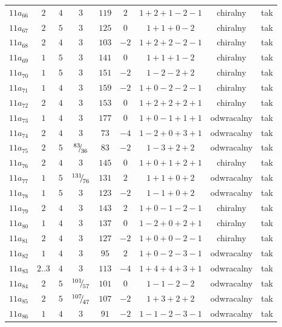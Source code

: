 \begin{longtable}{ccccccccc}
$11a_{66}$ & $2$ & $4$ & $3$ & $119$ & $2$ & $1+2+1-2-1$ & chiralny & tak \\
$11a_{67}$ & $2$ & $5$ & $3$ & $125$ & $0$ & $1+1+0-2$ & chiralny & tak \\
$11a_{68}$ & $2$ & $4$ & $3$ & $103$ & $-2$ & $1+2+2-2-1$ & chiralny & tak \\
$11a_{69}$ & $1$ & $5$ & $3$ & $141$ & $0$ & $1+1+1-2$ & chiralny & tak \\
$11a_{70}$ & $1$ & $5$ & $3$ & $151$ & $-2$ & $1-2-2+2$ & chiralny & tak \\
$11a_{71}$ & $1$ & $4$ & $3$ & $159$ & $-2$ & $1+0-2-2-1$ & chiralny & tak \\
$11a_{72}$ & $2$ & $4$ & $3$ & $153$ & $0$ & $1+2+2+2+1$ & chiralny & tak \\
$11a_{73}$ & $1$ & $4$ & $3$ & $177$ & $0$ & $1+0-1+1+1$ & odwracalny & tak \\
$11a_{74}$ & $2$ & $4$ & $3$ & $73$ & $-4$ & $1-2+0+3+1$ & odwracalny & tak \\
$11a_{75}$ & $2$ & $5$ & ${}^{83}{\mskip -5mu/\mskip -3mu}_{36}$ & $83$ & $-2$ & $1-3+2+2$ & odwracalny & tak \\
$11a_{76}$ & $2$ & $4$ & $3$ & $145$ & $0$ & $1+0+1+2+1$ & chiralny & tak \\
$11a_{77}$ & $1$ & $5$ & ${}^{131}{\mskip -5mu/\mskip -3mu}_{76}$ & $131$ & $2$ & $1+1+0+2$ & odwracalny & tak \\
$11a_{78}$ & $1$ & $5$ & $3$ & $123$ & $-2$ & $1-1+0+2$ & odwracalny & tak \\
$11a_{79}$ & $2$ & $4$ & $3$ & $143$ & $2$ & $1+0-1-2-1$ & chiralny & tak \\
$11a_{80}$ & $1$ & $4$ & $3$ & $137$ & $0$ & $1-2+0+2+1$ & chiralny & tak \\
$11a_{81}$ & $2$ & $4$ & $3$ & $127$ & $-2$ & $1+0+0-2-1$ & chiralny & tak \\
$11a_{82}$ & $1$ & $4$ & $3$ & $95$ & $2$ & $1+0-2-3-1$ & odwracalny & tak \\
$11a_{83}$ & $2..3$ & $4$ & $3$ & $113$ & $-4$ & $1+4+4+3+1$ & odwracalny & tak \\
$11a_{84}$ & $2$ & $5$ & ${}^{101}{\mskip -5mu/\mskip -3mu}_{57}$ & $101$ & $0$ & $1-1-2-2$ & odwracalny & tak \\
$11a_{85}$ & $2$ & $5$ & ${}^{107}{\mskip -5mu/\mskip -3mu}_{47}$ & $107$ & $-2$ & $1+3+2+2$ & odwracalny & tak \\
$11a_{86}$ & $1$ & $4$ & $3$ & $91$ & $-2$ & $1-1-2-3-1$ & odwracalny & tak \\

\end{longtable}
